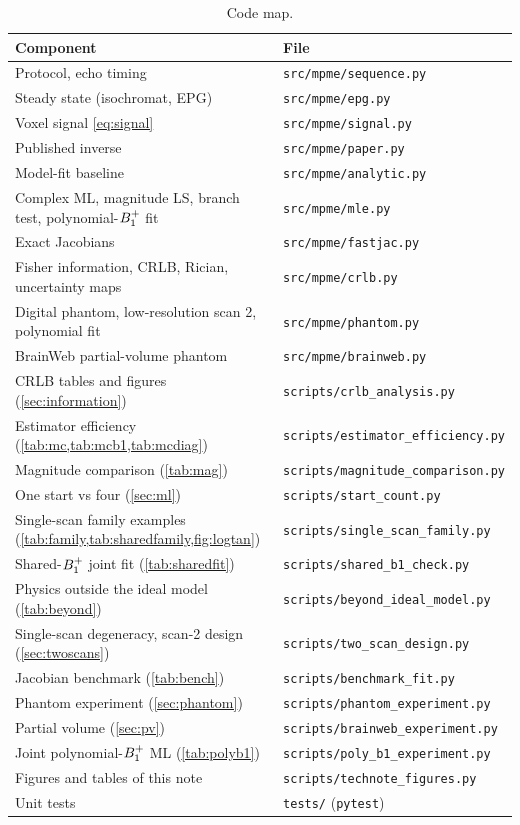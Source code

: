 \begin{table}[!htbp]
\centering
\caption{Code map.}
\small
\begin{tabular}{ll}
\toprule
Component & File\\
\midrule
Protocol, echo timing & \texttt{src/mpme/sequence.py}\\
Steady state (isochromat, EPG) & \texttt{src/mpme/epg.py}\\
Voxel signal \eqref{eq:signal} & \texttt{src/mpme/signal.py}\\
Published inverse & \texttt{src/mpme/paper.py}\\
Model-fit baseline & \texttt{src/mpme/analytic.py}\\
Complex ML, magnitude LS, branch test, polynomial-$B_1^{+}$ fit & \texttt{src/mpme/mle.py}\\
Exact Jacobians & \texttt{src/mpme/fastjac.py}\\
Fisher information, CRLB, Rician, uncertainty maps & \texttt{src/mpme/crlb.py}\\
Digital phantom, low-resolution scan 2, polynomial fit & \texttt{src/mpme/phantom.py}\\
BrainWeb partial-volume phantom & \texttt{src/mpme/brainweb.py}\\
\midrule
CRLB tables and figures (\cref{sec:information}) & \texttt{scripts/crlb\_analysis.py}\\
Estimator efficiency (\cref{tab:mc,tab:mcb1,tab:mcdiag}) & \texttt{scripts/estimator\_efficiency.py}\\
Magnitude comparison (\cref{tab:mag}) & \texttt{scripts/magnitude\_comparison.py}\\
One start vs four (\cref{sec:ml}) & \texttt{scripts/start\_count.py}\\
Single-scan family examples (\cref{tab:family,tab:sharedfamily,fig:logtan}) & \texttt{scripts/single\_scan\_family.py}\\
Shared-$B_1^{+}$ joint fit (\cref{tab:sharedfit}) & \texttt{scripts/shared\_b1\_check.py}\\
Physics outside the ideal model (\cref{tab:beyond}) & \texttt{scripts/beyond\_ideal\_model.py}\\
Single-scan degeneracy, scan-2 design (\cref{sec:twoscans}) & \texttt{scripts/two\_scan\_design.py}\\
Jacobian benchmark (\cref{tab:bench}) & \texttt{scripts/benchmark\_fit.py}\\
Phantom experiment (\cref{sec:phantom}) & \texttt{scripts/phantom\_experiment.py}\\
Partial volume (\cref{sec:pv}) & \texttt{scripts/brainweb\_experiment.py}\\
Joint polynomial-$B_1^{+}$ ML (\cref{tab:polyb1}) & \texttt{scripts/poly\_b1\_experiment.py}\\
Figures and tables of this note & \texttt{scripts/technote\_figures.py}\\
Unit tests & \texttt{tests/} (\texttt{pytest})\\
\bottomrule
\end{tabular}
\end{table}

